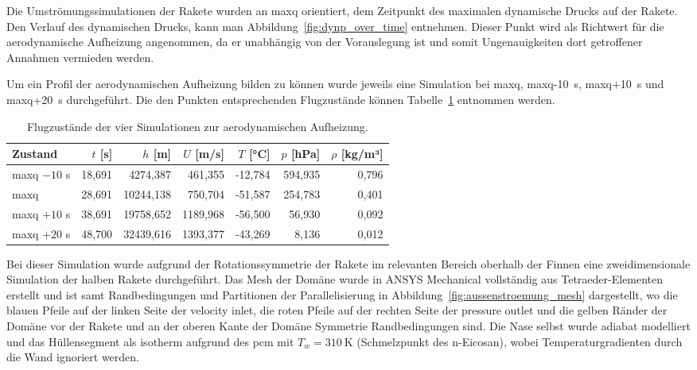 Die Umströmungssimulationen der Rakete wurden an \ac{maxq} orientiert, dem Zeitpunkt des maximalen dynamische Drucks auf der Rakete.
Den Verlauf des dynamischen Drucks, kann man Abbildung~\ref{fig:dynp_over_time} entnehmen.
Dieser Punkt wird als Richtwert für die aerodynamische Aufheizung angenommen, da er unabhängig von der Vorauslegung ist und somit Ungenauigkeiten dort getroffener Annahmen vermieden werden.

Um ein Profil der aerodynamischen Aufheizung bilden zu können wurde jeweils eine Simulation bei \ac{maxq}, \ac{maxq}-\SI{10}{\second},
\ac{maxq}+\SI{10}{\second} und \ac{maxq}+\SI{20}{\second} durchgeführt. Die den Punkten entsprechenden Flugzustände können Tabelle~\ref{tab:simulation_flugzustand} entnommen werden.

\begin{table}[H]
  \centering
  \caption{Flugzustände der vier Simulationen zur aerodynamischen Aufheizung.}\label{tab:simulation_flugzustand}

  \begin{tabular}{lrrrrrr}
    \toprule[1pt]
    Zustand & $t$ [s] & $h$ [m] & $U$ [m/s] & $T$ [°C] & $p$ [hPa] & $\rho$ [kg/m³] \\
    \midrule[0.5pt]
    \ac{maxq} $-10$ s    & 18,691 & 4274,387  & 461,355  & -12,784 & 594,935 & 0,796 \\
    \ac{maxq}            & 28,691 & 10244,138 & 750,704  & -51,587 & 254,783 & 0,401 \\
    \ac{maxq} $+10$ s    & 38,691 & 19758,652 & 1189,968 & -56,500 & 56,930  & 0,092 \\
    \ac{maxq} $+20$ s    & 48,700 & 32439,616 & 1393,377 & -43,269 & 8,136   & 0,012 \\
    \bottomrule[1pt]
  \end{tabular}
\end{table}

Bei dieser Simulation wurde aufgrund der Rotationssymmetrie der Rakete im relevanten Bereich oberhalb der Finnen eine zweidimensionale Simulation der halben Rakete durchgeführt.
Das Mesh der Domäne wurde in ANSYS Mechanical vollständig aus Tetraeder-Elementen erstellt und ist samt Randbedingungen und Partitionen der Parallelisierung in Abbildung~\ref{fig:aussenstroemung_mesh} dargestellt,
wo die blauen Pfeile auf der linken Seite der velocity inlet, die roten Pfeile auf der rechten Seite der pressure outlet und die gelben Ränder der Domäne
vor der Rakete und an der oberen Kante der Domäne Symmetrie Randbedingungen sind.
Die Nase selbst wurde adiabat modelliert und das Hüllensegment als isotherm aufgrund des \ac{pcm} mit $T_w = \SI{310}{\kelvin}$ (Schmelzpunkt des n-Eicosan), wobei Temperaturgradienten durch die Wand
ignoriert werden.

